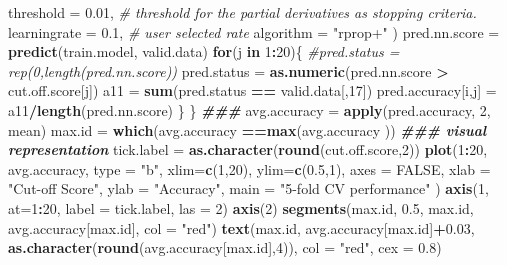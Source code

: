 \documentclass[
]{book}
\newenvironment{Shaded}{\begin{snugshade}}{\end{snugshade}}
\newcommand{\AttributeTok}[1]{\textcolor[rgb]{0.13,0.29,0.53}{#1}}
\newcommand{\CommentTok}[1]{\textcolor[rgb]{0.56,0.35,0.01}{\textit{#1}}}
\newcommand{\ConstantTok}[1]{\textcolor[rgb]{0.56,0.35,0.01}{#1}}
\newcommand{\ControlFlowTok}[1]{\textcolor[rgb]{0.13,0.29,0.53}{\textbf{#1}}}
\newcommand{\DecValTok}[1]{\textcolor[rgb]{0.00,0.00,0.81}{#1}}
\newcommand{\DocumentationTok}[1]{\textcolor[rgb]{0.56,0.35,0.01}{\textbf{\textit{#1}}}}
\newcommand{\FloatTok}[1]{\textcolor[rgb]{0.00,0.00,0.81}{#1}}
\newcommand{\FunctionTok}[1]{\textcolor[rgb]{0.13,0.29,0.53}{\textbf{#1}}}
\newcommand{\NormalTok}[1]{#1}
\newcommand{\OtherTok}[1]{\textcolor[rgb]{0.56,0.35,0.01}{#1}}
\newcommand{\SpecialCharTok}[1]{\textcolor[rgb]{0.81,0.36,0.00}{\textbf{#1}}}
\newcommand{\StringTok}[1]{\textcolor[rgb]{0.31,0.60,0.02}{#1}}
\begin{document}
\begin{Shaded}
\begin{Highlighting}[]
                         \AttributeTok{threshold =} \FloatTok{0.01}\NormalTok{,         }\CommentTok{\# threshold for the partial derivatives as stopping criteria.}
                         \AttributeTok{learningrate =} \FloatTok{0.1}\NormalTok{,       }\CommentTok{\# user selected rate}
                         \AttributeTok{algorithm =} \StringTok{"rprop+"}
\NormalTok{                         )}
\NormalTok{    pred.nn.score }\OtherTok{=} \FunctionTok{predict}\NormalTok{(train.model, valid.data)}
    \ControlFlowTok{for}\NormalTok{(j }\ControlFlowTok{in} \DecValTok{1}\SpecialCharTok{:}\DecValTok{20}\NormalTok{)\{}
    \CommentTok{\#pred.status = rep(0,length(pred.nn.score))}
\NormalTok{    pred.status }\OtherTok{=} \FunctionTok{as.numeric}\NormalTok{(pred.nn.score }\SpecialCharTok{\textgreater{}}\NormalTok{ cut.off.score[j])}
\NormalTok{    a11 }\OtherTok{=} \FunctionTok{sum}\NormalTok{(pred.status }\SpecialCharTok{==}\NormalTok{ valid.data[,}\DecValTok{17}\NormalTok{])}
\NormalTok{    pred.accuracy[i,j] }\OtherTok{=}\NormalTok{ a11}\SpecialCharTok{/}\FunctionTok{length}\NormalTok{(pred.nn.score)}
\NormalTok{  \}}
\NormalTok{\}}
\DocumentationTok{\#\#\#  }
\NormalTok{avg.accuracy }\OtherTok{=} \FunctionTok{apply}\NormalTok{(pred.accuracy, }\DecValTok{2}\NormalTok{, mean)}
\NormalTok{max.id }\OtherTok{=} \FunctionTok{which}\NormalTok{(avg.accuracy }\SpecialCharTok{==}\FunctionTok{max}\NormalTok{(avg.accuracy ))}
\DocumentationTok{\#\#\# visual representation}
\NormalTok{tick.label }\OtherTok{=} \FunctionTok{as.character}\NormalTok{(}\FunctionTok{round}\NormalTok{(cut.off.score,}\DecValTok{2}\NormalTok{))}
\FunctionTok{plot}\NormalTok{(}\DecValTok{1}\SpecialCharTok{:}\DecValTok{20}\NormalTok{, avg.accuracy, }\AttributeTok{type =} \StringTok{"b"}\NormalTok{,}
     \AttributeTok{xlim=}\FunctionTok{c}\NormalTok{(}\DecValTok{1}\NormalTok{,}\DecValTok{20}\NormalTok{), }
     \AttributeTok{ylim=}\FunctionTok{c}\NormalTok{(}\FloatTok{0.5}\NormalTok{,}\DecValTok{1}\NormalTok{), }
     \AttributeTok{axes =} \ConstantTok{FALSE}\NormalTok{,}
     \AttributeTok{xlab =} \StringTok{"Cut{-}off Score"}\NormalTok{,}
     \AttributeTok{ylab =} \StringTok{"Accuracy"}\NormalTok{,}
     \AttributeTok{main =} \StringTok{"5{-}fold CV performance"}
\NormalTok{     )}
\FunctionTok{axis}\NormalTok{(}\DecValTok{1}\NormalTok{, }\AttributeTok{at=}\DecValTok{1}\SpecialCharTok{:}\DecValTok{20}\NormalTok{, }\AttributeTok{label =}\NormalTok{ tick.label, }\AttributeTok{las =} \DecValTok{2}\NormalTok{)}
\FunctionTok{axis}\NormalTok{(}\DecValTok{2}\NormalTok{)}
\FunctionTok{segments}\NormalTok{(max.id, }\FloatTok{0.5}\NormalTok{, max.id, avg.accuracy[max.id], }\AttributeTok{col =} \StringTok{"red"}\NormalTok{)}
\FunctionTok{text}\NormalTok{(max.id, avg.accuracy[max.id]}\SpecialCharTok{+}\FloatTok{0.03}\NormalTok{, }\FunctionTok{as.character}\NormalTok{(}\FunctionTok{round}\NormalTok{(avg.accuracy[max.id],}\DecValTok{4}\NormalTok{)), }\AttributeTok{col =} \StringTok{"red"}\NormalTok{, }\AttributeTok{cex =} \FloatTok{0.8}\NormalTok{)}
\end{Highlighting}
\end{Shaded}
\end{document}
